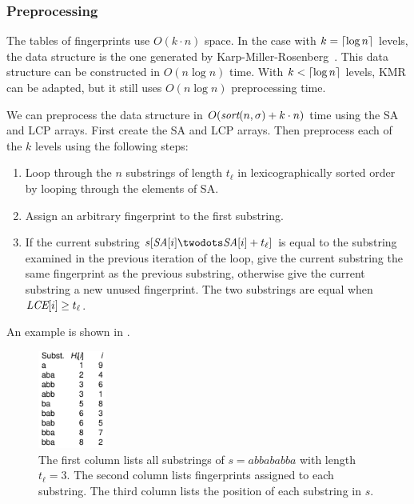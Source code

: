 \documentclass[a4]{article}
\newcommand*{\pref}{\prettyref}
\begin{document}
\subsubsection{Preprocessing}

The tables of fingerprints use $O(k\cdot n)$ space. In the case with $k=\lceil\log n\rceil$ levels, the data structure is the one generated by Karp-Miller-Rosenberg~\cite{karp-miller-rosenberg}. This data structure can be constructed in $O(n\log n)$ time. With $k<\lceil\log n\rceil$ levels, KMR can be adapted, but it still uses $O(n\log n)$ preprocessing time.

We can preprocess the data structure in $O(\textit{sort}(n,\sigma) + k\cdot n)$ time using the SA and LCP arrays. First create the SA and LCP arrays. Then preprocess each of the $k$ levels using the following steps:
\begin{samepage}
\begin{enumerate}
\item Loop through the $n$ substrings of length $t_\ell$ in lexicographically sorted order by looping through the elements of SA.
\item Assign an arbitrary fingerprint to the first substring.
\item If the current substring $s[\SA[i]\twodots\SA[i]+t_\ell]$ is equal to the substring examined in the previous iteration of the loop, give the current substring the same fingerprint as the previous substring, otherwise give the current substring a new unused fingerprint. The two substrings are equal when $\textit{LCE}[i] \geq t_\ell$.
\end{enumerate}

An example is shown in \pref{fig:fingerprint-preproc}.
\end{samepage}

\begin{figure}[tp]
    \begin{center}
        \includegraphics[width=0.2\textwidth,page=1]{fingerprint-preproc.pdf}
    \end{center}
    \caption{\label{fig:fingerprint-preproc}The first column lists all substrings of $s=abbababba$ with length $t_\ell = 3$. The second column lists fingerprints assigned to each substring. The third column lists the position of each substring in $s$.}
\end{figure}
\end{document}
